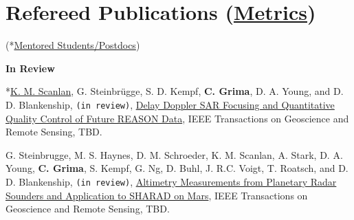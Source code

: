 \section*{Refereed Publications (\href{https://scholar.google.com/citations?user=kaUVku0AAAAJ&hl=fr}{Metrics})}

(*\underline{Mentored Students/Postdocs})
\vspace{1em}

\textbf{In Review}
\begin{etaremune}
\def\labelenumi{\arabic{enumi}.}
\item
  *\underline{K. M. Scanlan}, G. Steinbrügge, S. D. Kempf, \textbf{C. Grima}, D. A. Young, and D. D. Blankenship, \texttt{(in review)}, \href{}{Delay Doppler SAR Focusing and Quantitative Quality Control of Future REASON Data}, IEEE Transactions on Geoscience and Remote Sensing, TBD.
\item
  G. Steinbrugge, M. S. Haynes, D. M. Schroeder, K. M. Scanlan, A. Stark, D. A. Young, \textbf{C. Grima}, S. Kempf, G. Ng, D. Buhl, J. R.C. Voigt, T. Roatsch, and D. D. Blankenship, \texttt{(in review)}, \href{}{Altimetry Measurements from Planetary Radar Sounders and Application to SHARAD on Mars}, IEEE Transactions on Geoscience and Remote Sensing, TBD.
\end{etaremune}

